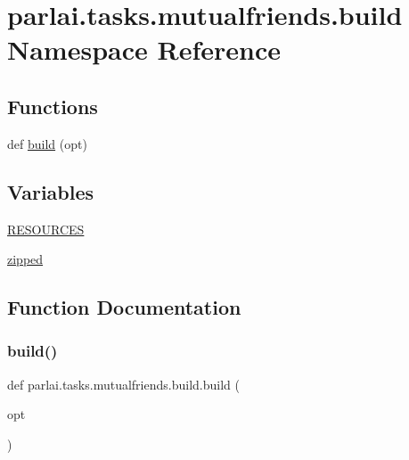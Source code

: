 \hypertarget{namespaceparlai_1_1tasks_1_1mutualfriends_1_1build}{}\section{parlai.\+tasks.\+mutualfriends.\+build Namespace Reference}
\label{namespaceparlai_1_1tasks_1_1mutualfriends_1_1build}
\subsection*{Functions}
\begin{DoxyCompactItemize}
\item 
def \hyperlink{namespaceparlai_1_1tasks_1_1mutualfriends_1_1build_ab42304948cd357bcb503986b9e4bae7a}{build} (opt)
\end{DoxyCompactItemize}
\subsection*{Variables}
\begin{DoxyCompactItemize}
\item 
\hyperlink{namespaceparlai_1_1tasks_1_1mutualfriends_1_1build_a3f910f7699f7aa46c45ca749f51c0177}{R\+E\+S\+O\+U\+R\+C\+ES}
\item 
\hyperlink{namespaceparlai_1_1tasks_1_1mutualfriends_1_1build_a5ae9c65997047901b6bc995b836f4abb}{zipped}
\end{DoxyCompactItemize}


\subsection{Function Documentation}
\mbox{\label{namespaceparlai_1_1tasks_1_1mutualfriends_1_1build_ab42304948cd357bcb503986b9e4bae7a}} 
\subsubsection{\texorpdfstring{build()}{build()}}
{\footnotesize\ttfamily def parlai.\+tasks.\+mutualfriends.\+build.\+build (\begin{DoxyParamCaption}\item[{}]{opt }\end{DoxyParamCaption})}



